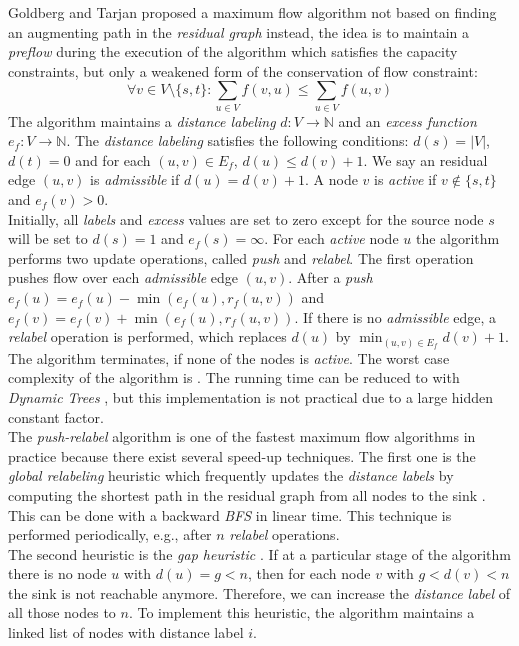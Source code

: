Goldberg and Tarjan \cite{goldberg1988new} proposed a maximum flow algorithm
not based on finding an augmenting path in the \emph{residual graph} instead, the idea is
to maintain a \emph{preflow} during the execution of the algorithm which satisfies the capacity 
constraints, but only a weakened form of the conservation of flow constraint:
\[\forall v \in V \setminus \{s,t\}: \sum_{u \in V} f(v,u) \le \sum_{u \in V} f(u,v)\]
The algorithm maintains a \emph{distance labeling} $d: V \rightarrow \mathbb{N}$ and an 
\emph{excess function} $e_f: V \rightarrow \mathbb{N}$. The \emph{distance labeling} satisfies
the following conditions: $d(s) = |V|$, $d(t) = 0$ and for each $(u,v) \in E_f$, $d(u) \le d(v) + 1$. We say an
residual edge $(u,v)$ is \emph{admissible} if $d(u) = d(v) + 1$. A node $v$ is \emph{active}
if $v \notin \{s,t\}$ and $e_f(v) > 0$.\\
Initially, all \emph{labels} and \emph{excess} values are set to zero except for the source node $s$ will be set to $d(s) = 1$
and $e_f(s) = \infty$. For each \emph{active} node $u$ the algorithm performs two update
operations, called \emph{push} and \emph{relabel}. The first operation pushes flow
over each \emph{admissible} edge $(u,v)$. After a \emph{push} $e_f(u) = e_f(u) - 
\min{(e_f(u),r_f(u,v))}$ and $e_f(v) = e_f(v) + \min{(e_f(u),r_f(u,v))}$. If there is no
\emph{admissible} edge, a \emph{relabel} operation is performed, which replaces $d(u)$ by
$\min_{(u,v) \in E_f} d(v) + 1$. The algorithm terminates, if none of the nodes is \emph{active}.
The worst case complexity of the algorithm is . The running time can be reduced
to  with \emph{Dynamic Trees} \cite{goldberg1988new, sleator1981data}, but this
implementation is not practical due to a large hidden constant factor.\\
The \emph{push-relabel} algorithm is one of the fastest maximum flow algorithms in practice
because there exist several speed-up techniques. The first one is
the \emph{global relabeling} heuristic which frequently updates the \emph{distance labels} by computing
the shortest path in the residual graph from all nodes to the sink \cite{cherkassky1997implementing}.
This can be done with a backward \emph{BFS} in linear time. This technique is performed periodically,
e.g., after $n$ \emph{relabel} operations. \\
The second heuristic is the \emph{gap heuristic} \cite{cherkassky1994fast,derigs1989implementing}.
If at a particular stage of the algorithm there is no node $u$ with $d(u) = g < n$, then for each node
$v$ with $g < d(v) < n$ the sink is not reachable anymore. Therefore, we can increase the \emph{distance
label} of all those nodes to $n$. To implement this heuristic, the algorithm maintains a linked list of
nodes with distance label $i$.

